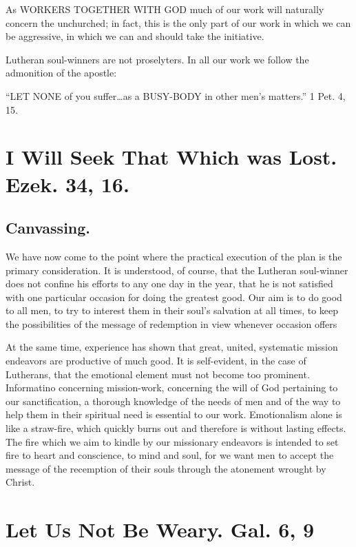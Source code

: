 \documentclass[
]{book}
\begin{document}
As WORKERS TOGETHER WITH GOD much of our work will naturally concern the unchurched; in fact, this is the only part of our work in which we can be aggressive, in which we can and should take the initiative.

Lutheran soul-winners are not proselyters. In all our work we follow the admonition of the apostle:

``LET NONE of you suffer\ldots as a BUSY-BODY in other men's matters.'' 1 Pet. 4, 15.

\hypertarget{i-will-seek-that-which-was-lost.-ezek.-34-16.}{%
\chapter{I Will Seek That Which was Lost. Ezek. 34, 16.}\label{i-will-seek-that-which-was-lost.-ezek.-34-16.}}

\hypertarget{canvassing.}{%
\section*{Canvassing.}\label{canvassing.}}

We have now come to the point where the practical execution of the plan is the primary consideration. It is understood, of course, that the Lutheran soul-winner does not confine his efforts to any one day in the year, that he is not satisfied with one particular occasion for doing the greatest good. Our aim is to do good to all men, to try to interest them in their soul's salvation at all times, to keep the possibilities of the message of redemption in view whenever occasion offers

At the same time, experience has shown that great, united, systematic mission endeavors are productive of much good. It is self-evident, in the case of Lutherans, that the emotional element must not become too prominent. Informatino concerning mission-work, concerning the will of God pertaining to our sanctification, a thorough knowledge of the needs of men and of the way to help them in their spiritual need is essential to our work. Emotionalism alone is like a straw-fire, which quickly burns out and therefore is without lasting effects. The fire which we aim to kindle by our missionary endeavors is intended to set fire to heart and conscience, to mind and soul, for we want men to accept the message of the recemption of their souls through the atonement wrought by Christ.

\hypertarget{let-us-not-be-weary.-gal.-6-9}{%
\chapter{Let Us Not Be Weary. Gal. 6, 9}\label{let-us-not-be-weary.-gal.-6-9}}
\end{document}
